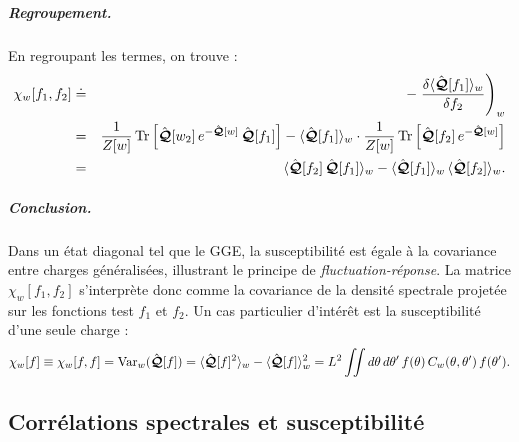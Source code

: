 \subparagraph{Regroupement.}
En regroupant les termes, on trouve :
\begin{eqnarray*}
	\chi_w[f_1, f_2]&  \doteq & - \left.\frac{\delta \langle \hat{\bm{\mathcal{Q}}}[f_1] \rangle_w}{\delta f_2} \right )_w  \\
&=& \frac{1}{Z[w]}\, \mathrm{Tr}\left[ \hat{\bm{\mathcal{Q}}}[w_2]\, e^{-\hat{\bm{\mathcal{Q}}}[w]}\, \hat{\bm{\mathcal{Q}}}[f_1] \right]
- \langle \hat{\bm{\mathcal{Q}}}[f_1] \rangle_w \cdot \frac{1}{Z[w]}\, \mathrm{Tr}\left[ \hat{\bm{\mathcal{Q}}}[f_2]\, e^{-\hat{\bm{\mathcal{Q}}}[w]} \right] \\
&=& \langle \hat{\bm{\mathcal{Q}}}[f_2]\, \hat{\bm{\mathcal{Q}}}[f_1] \rangle_w - \langle \hat{\bm{\mathcal{Q}}}[f_1] \rangle_w\, \langle \hat{\bm{\mathcal{Q}}}[f_2] \rangle_w.
\end{eqnarray*}

\medskip

\subparagraph{Conclusion.} Dans un état diagonal tel que le GGE, la susceptibilité est égale à la covariance entre charges généralisées, illustrant le principe de \emph{fluctuation-réponse}.
La matrice $\chi_w[f_1, f_2]$ s’interprète donc comme la covariance de la densité spectrale projetée sur les fonctions test $f_1$ et $f_2$.
Un cas particulier d’intérêt est la susceptibilité d’une seule charge :
\begin{eqnarray*}
\chi_w[f] \equiv \chi_w[f, f] = \mathrm{Var}_w(\hat{\bm{\mathcal{Q}}}[f]) = \langle \hat{\bm{\mathcal{Q}}}[f]^2 \rangle_w - \langle \hat{\bm{\mathcal{Q}}}[f] \rangle_w^2
= L^2 \iint d\theta\, d\theta'\, f(\theta)\, C_w(\theta, \theta')\, f(\theta').
\end{eqnarray*}


\subsection{Corrélations spectrales et susceptibilité}


